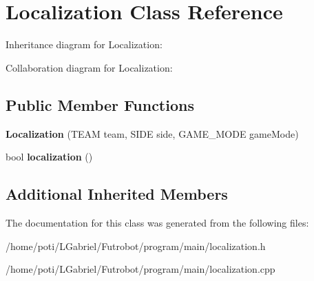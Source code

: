 \hypertarget{classLocalization}{}\section{Localization Class Reference}
\label{classLocalization}


Inheritance diagram for Localization\+:


Collaboration diagram for Localization\+:
\subsection*{Public Member Functions}
\begin{DoxyCompactItemize}
\item 
{\bfseries Localization} (T\+E\+AM team, S\+I\+DE side, G\+A\+M\+E\+\_\+\+M\+O\+DE game\+Mode)\hypertarget{classLocalization_a5bd99c3e8d68916c881ed5c40e47bd0f}{}\label{classLocalization_a5bd99c3e8d68916c881ed5c40e47bd0f}

\item 
bool {\bfseries localization} ()\hypertarget{classLocalization_aae30c6c4f851c8af0ae622ab4496e916}{}\label{classLocalization_aae30c6c4f851c8af0ae622ab4496e916}

\end{DoxyCompactItemize}
\subsection*{Additional Inherited Members}


The documentation for this class was generated from the following files\+:\begin{DoxyCompactItemize}
\item 
/home/poti/\+L\+Gabriel/\+Futrobot/program/main/localization.\+h\item 
/home/poti/\+L\+Gabriel/\+Futrobot/program/main/localization.\+cpp\end{DoxyCompactItemize}
